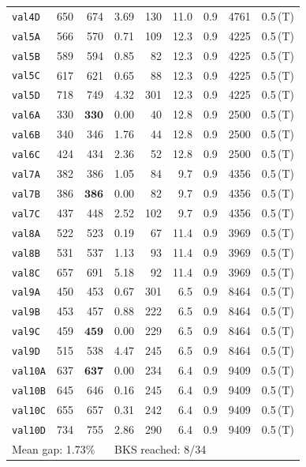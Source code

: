 \begin{longtable}{lrrrrrrrl}
\texttt{val4D} & 650 & 674 & 3.69 & 130 & 11.0 & 0.9 & 4761 & 0.5\,(T) \\
\texttt{val5A} & 566 & 570 & 0.71 & 109 & 12.3 & 0.9 & 4225 & 0.5\,(T) \\
\texttt{val5B} & 589 & 594 & 0.85 & 82 & 12.3 & 0.9 & 4225 & 0.5\,(T) \\
\texttt{val5C} & 617 & 621 & 0.65 & 88 & 12.3 & 0.9 & 4225 & 0.5\,(T) \\
\texttt{val5D} & 718 & 749 & 4.32 & 301 & 12.3 & 0.9 & 4225 & 0.5\,(T) \\
\texttt{val6A} & 330 & $\mathbf{330}$ & 0.00 & 40 & 12.8 & 0.9 & 2500 & 0.5\,(T) \\
\texttt{val6B} & 340 & 346 & 1.76 & 44 & 12.8 & 0.9 & 2500 & 0.5\,(T) \\
\texttt{val6C} & 424 & 434 & 2.36 & 52 & 12.8 & 0.9 & 2500 & 0.5\,(T) \\
\texttt{val7A} & 382 & 386 & 1.05 & 84 & 9.7 & 0.9 & 4356 & 0.5\,(T) \\
\texttt{val7B} & 386 & $\mathbf{386}$ & 0.00 & 82 & 9.7 & 0.9 & 4356 & 0.5\,(T) \\
\texttt{val7C} & 437 & 448 & 2.52 & 102 & 9.7 & 0.9 & 4356 & 0.5\,(T) \\
\texttt{val8A} & 522 & 523 & 0.19 & 67 & 11.4 & 0.9 & 3969 & 0.5\,(T) \\
\texttt{val8B} & 531 & 537 & 1.13 & 93 & 11.4 & 0.9 & 3969 & 0.5\,(T) \\
\texttt{val8C} & 657 & 691 & 5.18 & 92 & 11.4 & 0.9 & 3969 & 0.5\,(T) \\
\texttt{val9A} & 450 & 453 & 0.67 & 301 & 6.5 & 0.9 & 8464 & 0.5\,(T) \\
\texttt{val9B} & 453 & 457 & 0.88 & 222 & 6.5 & 0.9 & 8464 & 0.5\,(T) \\
\texttt{val9C} & 459 & $\mathbf{459}$ & 0.00 & 229 & 6.5 & 0.9 & 8464 & 0.5\,(T) \\
\texttt{val9D} & 515 & 538 & 4.47 & 245 & 6.5 & 0.9 & 8464 & 0.5\,(T) \\
\texttt{val10A} & 637 & $\mathbf{637}$ & 0.00 & 234 & 6.4 & 0.9 & 9409 & 0.5\,(T) \\
\texttt{val10B} & 645 & 646 & 0.16 & 245 & 6.4 & 0.9 & 9409 & 0.5\,(T) \\
\texttt{val10C} & 655 & 657 & 0.31 & 242 & 6.4 & 0.9 & 9409 & 0.5\,(T) \\
\texttt{val10D} & 734 & 755 & 2.86 & 290 & 6.4 & 0.9 & 9409 & 0.5\,(T) \\
\midrule
\multicolumn{3}{l}{Mean gap: 1.73\%} & \multicolumn{6}{l}{BKS reached: 8/34} \\
\end{longtable}
\endgroup